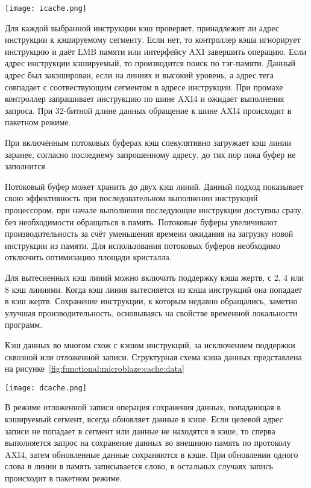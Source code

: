 \begin{center}
  \centering
  \texttt{[image: icache.png]}
  \label{fig:functional:microblaze:cache:instruction}
\end{center}

Для каждой выбранной инструкции кэш проверяет, принадлежит ли адрес инструкции
к кэшируемому сегменту. Если нет, то контроллер кэша игнорирует инструкцию и даёт
LMB памяти или интерфейсу AXI завершить операцию. Если адрес инструкции кэшируемый,
то производится поиск по тэг-памяти. Данный адрес был закэширован, если
на линиях  и  высокий уровень, а адрес тега совпадает с
соотвествующим сегментом в адресе инструкции. При промахе контроллер запрашивает
инструкцию по шине AXI4 и ожидает выполнения запроса. При 32-битной длине данных
обращение к шине AXI4 происходит в пакетном режиме.

При включённым потоковых буферах кэш спекулятивно загружает кэш линии заранее,
согласно последнему запрошенному адресу, до тих пор пока буфер не заполнится.

Потоковый буфер может хранить до двух кэш линий. Данный подход показывает свою
эффективность при последовательном выполнении инструкций процессором, при начале
выполнения последующие инструкции доступны сразу, без необходимости обращаться в
память. Потоковые буферы увеличивают производительность за счёт уменьшения
времени ожидания на загрузку новой инструкции из памяти. Для использования
потоковых буферов необходимо отключить оптимизацию площади кристалла.

Для вытесненных кэш линий можно включить поддержку кэша жертв, с 2, 4 или 8
кэш линиями. Когда кэш линия вытесняется из кэша инструкций она попадает в кэш
жертв. Сохранение инструкции, к которым недавно обращались, заметно улучшая
производительность, основываясь на свойстве временной локальности программ.

Кэш данных во многом схож с кэшом инструкций, за исключением поддержки
сквозной или отложенной записи. Структурная схема кэша данных представлена
на рисунке~\ref{fig:functional:microblaze:cache:data}

\begin{center}
  \centering
  \texttt{[image: dcache.png]}
  \label{fig:functional:microblaze:cache:data}
\end{center}

В режиме отложенной записи операция сохранения данных, попадающая
в кэшируемый сегмент, всегда обновляет данные в кэше. Если целевой
адрес записи не попадает в сегмент или данные не находятся в кэше,
то сперва выполняется запрос на сохранение данных во внешнюю память
по протоколу AXI4, затем обновленные данные сохраняются в кэше.
При обновлении одного слова в линии в память записывается слово, в
остальных случаях запись происходит в пакетном режиме.

